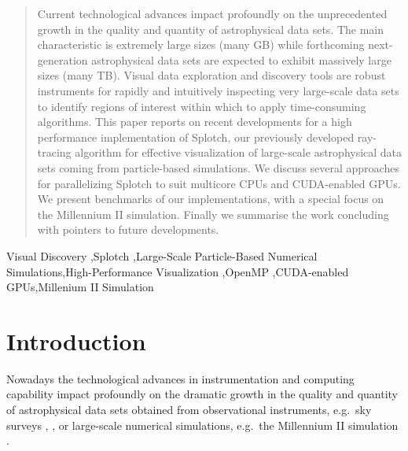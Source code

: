 \documentclass[1p,times]{elsarticle}
\begin{document}
\begin{frontmatter}
\begin{abstract}
Current technological advances impact profoundly on the unprecedented growth 
in the quality and quantity of astrophysical data sets. The main characteristic
is extremely large sizes (many GB) while forthcoming next-generation astrophysical
data sets are expected to exhibit massively large sizes (many TB). Visual data
exploration and discovery tools are robust instruments for rapidly and intuitively 
inspecting very large-scale data sets to identify regions of interest within
which to apply time-consuming algorithms.  This paper reports on recent developments 
for a high performance implementation of Splotch, our previously developed 
ray-tracing algorithm for effective visualization of large-scale astrophysical 
data sets coming from particle-based simulations. We discuss several approaches for
parallelizing Splotch to suit multicore CPUs and CUDA-enabled GPUs. 
We present benchmarks of our implementations, with a special focus on the 
Millennium II simulation. Finally we summarise the work concluding with pointers 
to future developments.

\end{abstract}

\begin{keyword}


Visual Discovery \sep Splotch \sep Large-Scale Particle-Based Numerical Simulations\sep High-Performance Visualization \sep OpenMP \sep CUDA-enabled GPUs\sep Millenium II Simulation 




\end{keyword}

\end{frontmatter}


\section{Introduction}
\label{intro}

Nowadays the technological advances in instrumentation and computing 
capability impact profoundly on the dramatic growth in the quality and 
quantity of astrophysical data sets obtained from observational instruments,
e.g.\ sky surveys \cite{sdss}, \cite{lofar}, or large-scale numerical
simulations, e.g.\ the Millennium II simulation \cite{2009MNRAS.398.1150B}.
\end{document}
